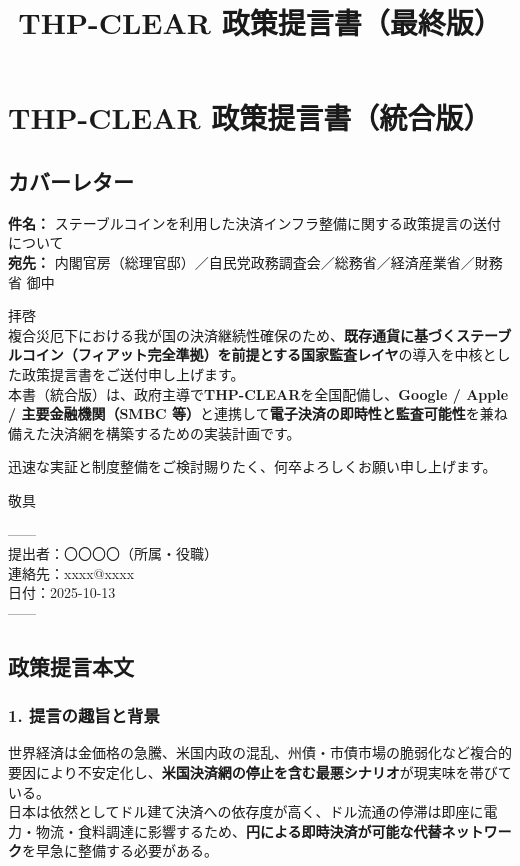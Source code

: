 \documentclass[
]{article}
\title{THP-CLEAR 政策提言書（最終版）}
\author{}
\date{}
\begin{document}
\maketitle

\section{THP-CLEAR
政策提言書（統合版）}\label{thp-clear-ux653fux7b56ux63d0ux8a00ux66f8ux7d71ux5408ux7248}

\subsection{カバーレター}\label{ux30abux30d0ux30fcux30ecux30bfux30fc}

\textbf{件名：}
ステーブルコインを利用した決済インフラ整備に関する政策提言の送付について\\
\textbf{宛先：}
内閣官房（総理官邸）／自民党政務調査会／総務省／経済産業省／財務省 御中

拝啓\\
複合災厄下における我が国の決済継続性確保のため、\textbf{既存通貨に基づくステーブルコイン（フィアット完全準拠）を前提とする国家監査レイヤ}の導入を中核とした政策提言書をご送付申し上げます。\\
本書（統合版）は、政府主導で\textbf{THP-CLEAR}を全国配備し、\textbf{Google
/ Apple / 主要金融機関（SMBC
等）}と連携して\textbf{電子決済の即時性と監査可能性}を兼ね備えた決済網を構築するための実装計画です。

迅速な実証と制度整備をご検討賜りたく、何卒よろしくお願い申し上げます。

敬具

------\\
提出者：〇〇〇〇（所属・役職）\\
連絡先：xxxx@xxxx\\
日付：2025-10-13\\
------

\subsection{政策提言本文}\label{ux653fux7b56ux63d0ux8a00ux672cux6587}

\subsubsection{1.
提言の趣旨と背景}\label{ux63d0ux8a00ux306eux8da3ux65e8ux3068ux80ccux666f}

世界経済は金価格の急騰、米国内政の混乱、州債・市債市場の脆弱化など複合的要因により不安定化し、\textbf{米国決済網の停止を含む最悪シナリオ}が現実味を帯びている。\\
日本は依然としてドル建て決済への依存度が高く、ドル流通の停滞は即座に電力・物流・食料調達に影響するため、\textbf{円による即時決済が可能な代替ネットワーク}を早急に整備する必要がある。
\end{document}
